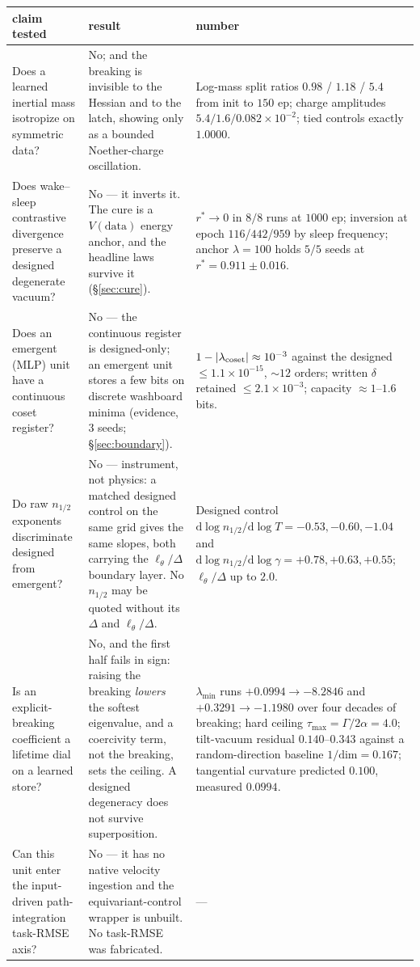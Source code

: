\documentclass{article}
\begin{document}
\begin{center}
\begin{tabular}{@{}p{1.52in} p{1.52in} p{2.06in}@{}}
\toprule
claim tested & result & number \\
\midrule
Does a learned inertial mass isotropize on symmetric data? &
No; and the breaking is invisible to the Hessian and to the latch, showing only as a bounded Noether-charge oscillation.   &
Log-mass split ratios $0.98$ / $1.18$ / $5.4$ from init to $150$ ep; charge amplitudes $5.4/1.6/0.082{\times}10^{-2}$; tied controls exactly $1.0000$. \\[2pt]
Does wake--sleep contrastive divergence preserve a designed degenerate vacuum? &
No --- it inverts it. The cure is a $V(\text{data})$ energy anchor, and the headline laws survive it (\S\ref{sec:cure}). &
$r^*\to0$ in $8/8$ runs at $1000$ ep; inversion at epoch $116$/$442$/$959$ by sleep frequency; anchor $\lambda{=}100$ holds $5/5$ seeds at $r^*{=}0.911\pm0.016$. \\[2pt]
Does an emergent (MLP) unit have a continuous coset register? &
No --- the continuous register is designed-only; an emergent unit stores a few bits on discrete washboard minima (evidence, $3$ seeds; \S\ref{sec:boundary}). &
$1-|\lambda_{\rm coset}|\approx10^{-3}$ against the designed $\le1.1{\times}10^{-15}$, $\sim\!12$ orders; written $\delta$ retained $\le2.1{\times}10^{-3}$; capacity $\approx1$--$1.6$ bits. \\[2pt]
Do raw $n_{1/2}$ exponents discriminate designed from emergent? &
No --- instrument, not physics: a matched designed control on the same grid gives the same slopes, both carrying the $\ell_\theta/\Delta$ boundary layer. No $n_{1/2}$ may be quoted without its $\Delta$ and $\ell_\theta/\Delta$. &
Designed control $\mathrm{d}\log n_{1/2}/\mathrm{d}\log T=-0.53,-0.60,-1.04$ and $\mathrm{d}\log n_{1/2}/\mathrm{d}\log\gamma=+0.78,+0.63,+0.55$; $\ell_\theta/\Delta$ up to $2.0$. \\[2pt]
Is an explicit-breaking coefficient a lifetime dial on a learned store? &
No, and the first half fails in sign: raising the breaking \emph{lowers} the softest eigenvalue, and a coercivity term, not the breaking, sets the ceiling. A designed degeneracy does not survive superposition. &
$\lambda_{\min}$ runs $+0.0994\to-8.2846$ and $+0.3291\to-1.1980$ over four decades of breaking; hard ceiling $\tau_{\max}=\Gamma/2\alpha=4.0$; tilt-vacuum residual $0.140$--$0.343$ against a random-direction baseline $1/\mathrm{dim}=0.167$; tangential curvature predicted $0.100$, measured $0.0994$. \\[2pt]
Can this unit enter the input-driven path-integration task-RMSE axis? &
No --- it has no native velocity ingestion and the equivariant-control wrapper is unbuilt. No task-RMSE was fabricated. &
--- \\[2pt]
\bottomrule
\end{tabular}
\end{center}
\end{document}
